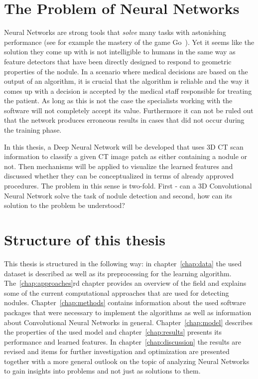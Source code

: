 \documentclass[main.tex]{subfiles}
\begin{document}
\section{The Problem of Neural Networks}
Neural Networks are strong tools that \emph{solve} many tasks with astonishing performance (see for example the mastery of the game Go~\cite{silver2017alphagozero}). Yet it seems like the solution they come up with is not intelligible to humans in the same way as feature detectors that have been directly designed to respond to geometric properties of the nodule. In a scenario where medical decisions are based on the output of an algorithm, it is crucial that the algorithm is reliable and the way it comes up with a decision is accepted by the medical staff responsible for treating the patient. As long as this is not the case the specialists working with the software will not completely accept its value. Furthermore it can not be ruled out that the network produces erroneous results in cases that did not occur during the training phase.

In this thesis, a Deep Neural Network will be developed that uses 3D CT scan information to classify a given CT image patch as either containing a nodule or not. Then mechanisms will be applied to visualize the learned features and discussed whether they can be conceptualized in terms of already approved procedures. The problem in this sense is two-fold. First - can a 3D Convolutional Neural Network solve the task of nodule detection and second, how can its solution to the problem be understood? 


\section{Structure of this thesis}
This thesis is structured in the following way: in chapter~\ref{chap:data} the used dataset is described as well as its preprocessing for the learning algorithm. The~\ref{chap:approaches}rd chapter provides an overview of the field and explains some of the current computational approaches that are used for detecting nodules. Chapter~\ref{chap:methods} contains information about the used software packages that were necessary to implement the algorithms as well as information about Convolutional Neural Networks in general. Chapter~\ref{chap:model} describes the properties of the used model and chapter~\ref{chap:results} presents its performance and learned features. In chapter~\ref{chap:discussion} the results are revised and items for further investigation and optimization are presented together with a more general outlook on the topic of analyzing Neural Networks to gain insights into problems and not just as solutions to them. 
\end{document}
